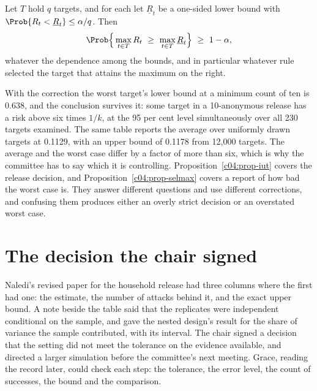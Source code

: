 \begin{proposition}\label{c04:prop-selmax}
Let $T$ hold $q$ targets, and for each let $\underline{R}_t$ be a one-sided lower bound
with $\Prob\{R_t < \underline{R}_t\} \le \alpha/q$. Then
\begin{equation}\label{c04:eq-bonf}
\Prob\Big\{\max_{t \in T} R_t \ \ge\ \max_{t \in T}\underline{R}_t\Big\} \ \ge\ 1-\alpha,
\end{equation}
whatever the dependence among the bounds, and in particular whatever rule selected the
target that attains the maximum on the right.
\end{proposition}

With the correction the worst target's lower bound at a minimum count of ten is 0.638,
and the conclusion survives it: some target in a 10-anonymous release has a risk above
six times $1/k$, at the 95 per cent level simultaneously over all 230 targets examined.
The same table reports the average over uniformly drawn targets at 0.1129, with an upper
bound of 0.1178 from 12,000 targets.
The average and the worst case differ by a factor of more than six, which is why the
committee has to say which it is controlling. Proposition~\ref{c04:prop-iut} covers the
release decision, and Proposition~\ref{c04:prop-selmax} covers a report of how bad the
worst case is. They answer different questions and use different corrections, and
confusing them produces either an overly strict decision or an overstated worst case.

\section{The decision the chair signed}

Naledi's revised paper for the household release had three columns where the first had
one: the estimate, the number of attacks behind it, and the exact upper bound. A note
beside the table said that the replicates were independent conditional on the sample, and
gave the nested design's result for the share of variance the sample contributed, with its
interval. The chair signed a decision that the setting did not meet the tolerance on the
evidence available, and directed a larger simulation before the committee's next meeting.
Grace, reading the record later, could check each step: the tolerance, the error level,
the count of successes, the bound and the comparison.

